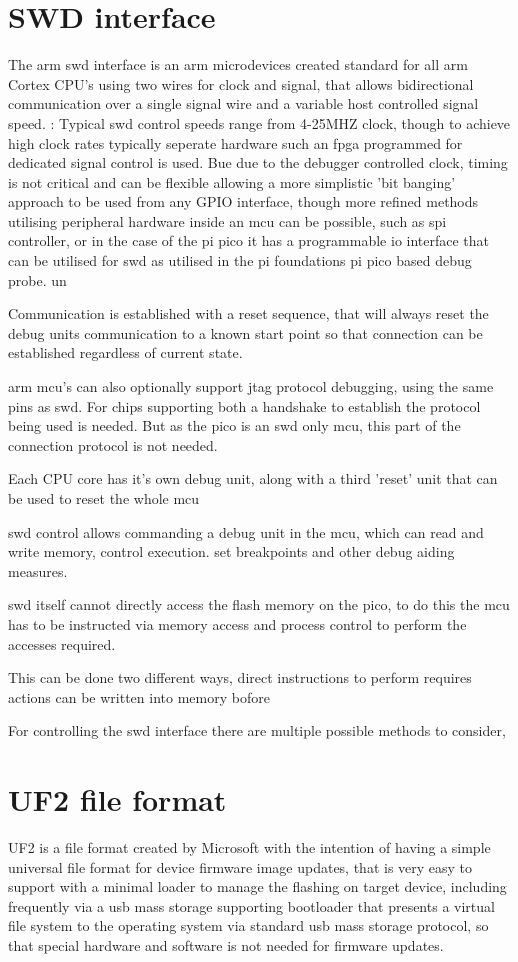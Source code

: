 \section{SWD interface}
The \gls{arm} \gls{swd} interface is an \gls{arm} microdevices created standard for all \gls{arm} Cortex CPU's using two wires for clock and signal, that allows bidirectional communication over a single signal wire and a variable host controlled signal speed.
:
Typical \gls{swd} control speeds range from 4-25MHZ clock, though to achieve high clock rates typically seperate hardware such an \gls{fpga} programmed for dedicated signal control is used. Bue due to the debugger controlled clock, timing is not critical and can be flexible allowing a more simplistic 'bit banging' approach to be used from any GPIO interface, though more refined methods utilising peripheral hardware inside an \gls{mcu} can be possible, such as \gls{spi} controller, or in the case of the pi pico it has a programmable io interface that can be utilised for \gls{swd} as utilised in the pi foundations pi pico based debug probe. un

Communication is established with a reset sequence, that will always reset the debug units communication to a known start point so that connection can be established regardless of current state.

\gls{arm} \gls{mcu}'s can also optionally support \gls{jtag} protocol debugging, using the same pins as \gls{swd}. For chips supporting both a handshake to establish the protocol being used is needed. But as the pico is an \gls{swd} only \gls{mcu}, this part of the connection protocol is not needed.

Each CPU core has it's own debug unit, along with a third 'reset' unit that can be used to reset the whole \gls{mcu}

\gls{swd}  control allows commanding a debug unit in the \gls{mcu}, which can read and write memory, control execution. set breakpoints and other debug aiding measures.

\gls{swd} itself cannot directly access the flash memory on the pico, to do this the \gls{mcu} has to be instructed via memory access and process control to perform the accesses required.

This can be done two different ways, direct instructions to perform requires actions can be written into memory
bofore

For controlling the \gls{swd} interface there are multiple possible methods to consider,
\pagebreak
\section{UF2 file format}
UF2 is a file format created by Microsoft with the intention of having a simple universal file format for device firmware image updates, that is very easy to support with a minimal loader to manage the flashing on target device, including frequently via a \gls{usb} mass storage supporting bootloader that presents a virtual file system to the operating system via standard \gls{usb} mass storage protocol, so that special hardware and software is not needed for firmware updates.


